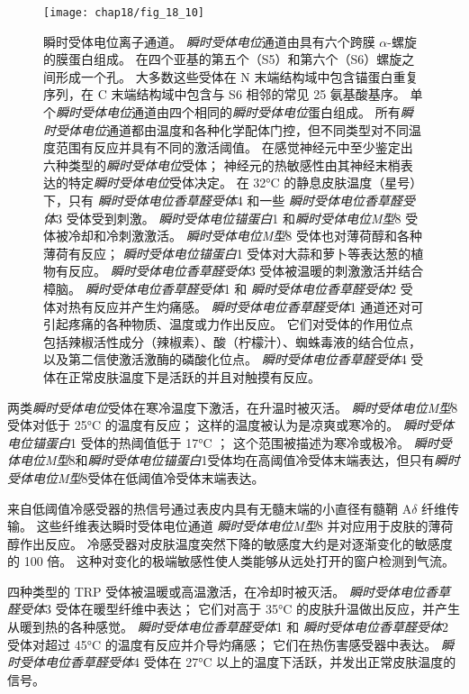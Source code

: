 \begin{figure}[htbp]
	\centering
	\texttt{[image: chap18/fig\_18\_10]}
	\caption{瞬时受体电位离子通道。
		\textit{瞬时受体电位}通道由具有六个跨膜 $\alpha$-螺旋的膜蛋白组成。
		在四个亚基的第五个（S5）和第六个（S6）螺旋之间形成一个孔。
		大多数这些受体在 N 末端结构域中包含锚蛋白重复序列，在 C 末端结构域中包含与 S6 相邻的常见 25 氨基酸基序。
		单个\textit{瞬时受体电位}通道由四个相同的\textit{瞬时受体电位}蛋白组成。
		所有\textit{瞬时受体电位}通道都由温度和各种化学配体门控，但不同类型对不同温度范围有反应并具有不同的激活阈值。
		在感觉神经元中至少鉴定出六种类型的\textit{瞬时受体电位}受体； 神经元的热敏感性由其神经末梢表达的特定\textit{瞬时受体电位}受体决定。
		在 32°C 的静息皮肤温度（星号）下，只有 \textit{瞬时受体电位香草醛受体}4 和一些 \textit{瞬时受体电位香草醛受体}3 受体受到刺激。
		\textit{瞬时受体电位锚蛋白}1 和\textit{瞬时受体电位M型}8 受体被冷却和冷刺激激活。
		\textit{瞬时受体电位M型}8 受体也对薄荷醇和各种薄荷有反应；
		\textit{瞬时受体电位锚蛋白}1 受体对大蒜和萝卜等表达葱的植物有反应。
		\textit{瞬时受体电位香草醛受体}3 受体被温暖的刺激激活并结合樟脑。
		\textit{瞬时受体电位香草醛受体}1 和 \textit{瞬时受体电位香草醛受体}2 受体对热有反应并产生灼痛感。 
		\textit{瞬时受体电位香草醛受体}1 通道还对可引起疼痛的各种物质、温度或力作出反应。
		它们对受体的作用位点包括辣椒活性成分（辣椒素）、酸（柠檬汁）、蜘蛛毒液的结合位点，以及第二信使激活激酶的磷酸化位点。
		\textit{瞬时受体电位香草醛受体}4 受体在正常皮肤温度下是活跃的并且对触摸有反应\cite{jordt2003lessons}。}
	\label{fig:18_10}
\end{figure}


两类\textit{瞬时受体电位}受体在寒冷温度下激活，在升温时被灭活。
\textit{瞬时受体电位M型}8 受体对低于 25°C 的温度有反应； 这样的温度被认为是凉爽或寒冷的。
\textit{瞬时受体电位锚蛋白}1 受体的热阈值低于 17°C ；
这个范围被描述为寒冷或极冷。
\textit{瞬时受体电位M型}8和\textit{瞬时受体电位锚蛋白}1受体均在高阈值冷受体末端表达，但只有\textit{瞬时受体电位M型}8受体在低阈值冷受体末端表达。


来自低阈值冷感受器的热信号通过表皮内具有无髓末端的小直径有髓鞘 A$\delta$ 纤维传输。
这些纤维表达瞬时受体电位通道 \textit{瞬时受体电位M型}8 并对应用于皮肤的薄荷醇作出反应。
冷感受器对皮肤温度突然下降的敏感度大约是对逐渐变化的敏感度的 100 倍。
这种对变化的极端敏感性使人类能够从远处打开的窗户检测到气流。


四种类型的 TRP 受体被温暖或高温激活，在冷却时被灭活。
\textit{瞬时受体电位香草醛受体}3 受体在暖型纤维中表达； 它们对高于 35°C 的皮肤升温做出反应，并产生从暖到热的各种感觉。
\textit{瞬时受体电位香草醛受体}1 和 \textit{瞬时受体电位香草醛受体}2 受体对超过 45°C 的温度有反应并介导灼痛感；
它们在热伤害感受器中表达。 
\textit{瞬时受体电位香草醛受体}4 受体在 27°C 以上的温度下活跃，并发出正常皮肤温度的信号。


